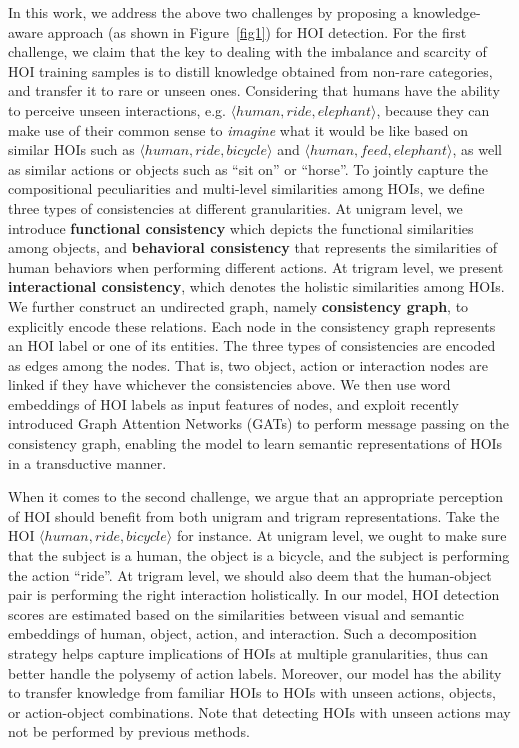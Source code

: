 \documentclass[sigconf,screen]{acmart}
\begin{document}
In this work, we address the above two challenges by proposing a knowledge-aware approach (as shown in Figure~\ref{fig1}) for HOI detection. For the first challenge, we claim that the key to dealing with the imbalance and scarcity of HOI training samples is to distill knowledge obtained from non-rare categories, and transfer it to rare or unseen ones. Considering that humans have the ability to perceive unseen interactions, e.g. $\langle human, ride, elephant \rangle$, because they can make use of their common sense to \textit{imagine} what it would be like based on similar HOIs such as $\langle human, ride, bicycle \rangle$ and $\langle human, feed, elephant \rangle$, as well as similar actions or objects such as ``sit on'' or ``horse''. To jointly capture the compositional peculiarities and multi-level similarities among HOIs, we define three types of consistencies at different granularities. At unigram level, we introduce \textbf{functional consistency} which depicts the functional similarities among objects, and \textbf{behavioral consistency} that represents the similarities of human behaviors when performing different actions. At trigram level, we present \textbf{interactional consistency}, which denotes the holistic similarities among HOIs. We further construct an undirected graph, namely \textbf{consistency graph}, to explicitly encode these relations. Each node in the consistency graph represents an HOI label or one of its entities. The three types of consistencies are encoded as edges among the nodes. That is, two object, action or interaction nodes are linked if they have whichever the consistencies above. We then use word embeddings of HOI labels as input features of nodes, and exploit recently introduced Graph Attention Networks (GATs) \cite{velickovic2018graph} to perform message passing on the consistency graph, enabling the model to learn semantic representations of HOIs in a transductive manner.

When it comes to the second challenge, we argue that an appropriate perception of HOI should benefit from both unigram and trigram representations. Take the HOI $\langle human, ride, bicycle \rangle$ for instance. At unigram level, we ought to make sure that the subject is a human, the object is a bicycle, and the subject is performing the action ``ride''. At trigram level, we should also deem that the human-object pair is performing the right interaction holistically. In our model, HOI detection scores are estimated based on the similarities between visual and semantic embeddings of human, object, action, and interaction. Such a decomposition strategy helps capture implications of HOIs at multiple granularities, thus can better handle the polysemy of action labels. Moreover, our model has the ability to transfer knowledge from familiar HOIs to HOIs with unseen actions, objects, or action-object combinations. Note that detecting HOIs with unseen actions may not be performed by previous methods.
\end{document}
